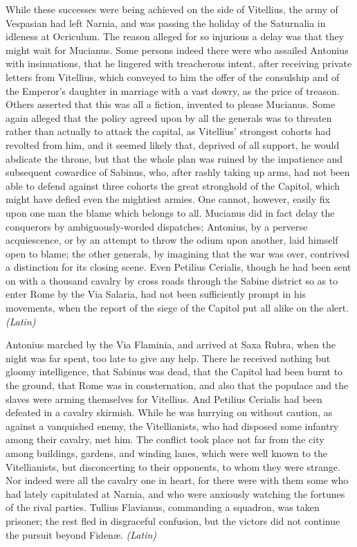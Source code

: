 While these successes were being achieved on the side of Vitellius, the army of Vespasian had left Narnia, and was passing the holiday of the Saturnalia in idleness at Ocriculum. The reason alleged for so injurious a delay was that they might wait for Mucianus. Some persons indeed there were who assailed Antonius with insinuations, that he lingered with treacherous intent, after receiving private letters from Vitellius, which conveyed to him the offer of the consulship and of the Emperor's daughter in marriage with a vast dowry, as the price of treason. Others asserted that this was all a fiction, invented to please Mucianus. Some again alleged that the policy agreed upon by all the generals was to threaten rather than actually to attack the capital, as Vitellius' strongest cohorts had revolted from him, and it seemed likely that, deprived of all support, he would abdicate the throne, but that the whole plan was ruined by the impatience and subsequent cowardice of Sabinus, who, after rashly taking up arms, had not been able to defend against three cohorts the great stronghold of the Capitol, which might have defied even the mightiest armies. One cannot, however, easily fix upon one man the blame which belongs to all. Mucianus did in fact delay the conquerors by ambiguously-worded dispatches; Antonius, by a perverse acquiescence, or by an attempt to throw the odium upon another, laid himself open to blame; the other generals, by imagining that the war was over, contrived a distinction for its closing scene. Even Petilius Cerialis, though he had been sent on with a thousand cavalry by cross roads through the Sabine district so as to enter Rome by the Via Salaria, had not been sufficiently prompt in his movements, when the report of the siege of the Capitol put all alike on the alert. \emph{(Latin)}


Antonius marched by the Via Flaminia, and arrived at Saxa Rubra, when the night was far spent, too late to give any help. There he received nothing but gloomy intelligence, that Sabinus was dead, that the Capitol had been burnt to the ground, that Rome was in consternation, and also that the populace and the slaves were arming themselves for Vitellius. And Petilius Cerialis had been defeated in a cavalry skirmish. While he was hurrying on without caution, as against a vanquished enemy, the Vitellianists, who had disposed some infantry among their cavalry, met him. The conflict took place not far from the city among buildings, gardens, and winding lanes, which were well known to the Vitellianists, but disconcerting to their opponents, to whom they were strange. Nor indeed were all the cavalry one in heart, for there were with them some who had lately capitulated at Narnia, and who were anxiously watching the fortunes of the rival parties. Tullius Flavianus, commanding a squadron, was taken prisoner; the rest fled in disgraceful confusion, but the victors did not continue the pursuit beyond Fidenæ. \emph{(Latin)}

